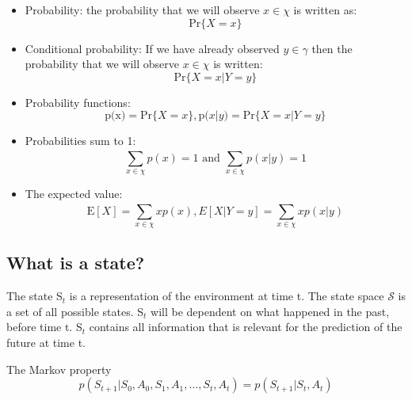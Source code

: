 \begin{itemize}
	\item Probability: the probability that we will observe $x \in \chi$ is written as: \\
		\begin{equation}
			\text{Pr}\{ X = x \}	
		\end{equation}
	\item Conditional probability: If we have already observed $y \in \gamma$ then the probability that we will observe $x \in \chi$ is written: \\
		\begin{equation}
			\text{Pr}\{X = x | Y = y\}
		\end{equation}
	\item Probability functions: \\
		\begin{equation}
			\text{p(x)} = \text{Pr}\{X=x \}, \text{p}(x |y) = \text{Pr}\{X=x | Y =y  \}
		\end{equation}
	\item Probabilities sum to 1: \\
		\begin{equation}
			\sum_{x \in \chi}^{} p(x) =1 \text{ and } \sum_{x \in \chi}^{} p(x |y) = 1
		\end{equation}
	\item The expected value: \\
		\begin{equation}
			\text{E} [X] = \sum_{x \in \chi}^{} xp(x), E[X |Y=y] = \sum_{x \in \chi}^{} xp(x |y) 
		\end{equation}
\end{itemize}


\subsection{What is a state?}
The state S$_t$ is a representation of the environment at time t. The state space $\mathcal{S}$ is a set of all possible states. S$_t$ will be dependent on what happened in the past, before time t. S$_t$ contains all information that is relevant for the prediction of the future at time t.


\begin{wbox}{The Markov property}
\begin{equation}
	p(S_{t+1} | S_0,A_0,S_1,A_1,\ldots,S_t,A_t) = p(S_{t+1}	| S_t, A_t	)
\end{equation}
\end{wbox}



